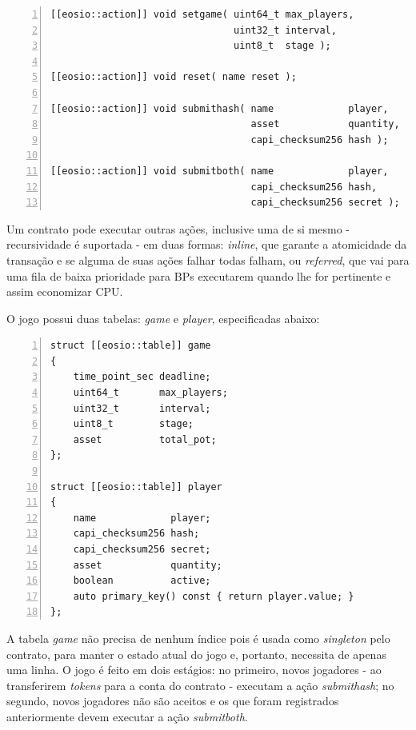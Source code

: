 \documentclass[a4paper,12pt]{monografia}
\theoremstyle{plain}
\theoremstyle{definition}
\theoremstyle{remark}
\begin{document}
\lstset{tabsize=5,language=C++,showstringspaces=false,basicstyle=\ttfamily\small,keywordstyle=\bf,breaklines=true}
\begin{singlespacing}
\begin{lstlisting}[frame=single,framexrightmargin=1pt,numbers=left]
[[eosio::action]] void setgame( uint64_t max_players,
                                uint32_t interval,
                                uint8_t  stage );

[[eosio::action]] void reset( name reset );

[[eosio::action]] void submithash( name             player,
                                   asset            quantity,
                                   capi_checksum256 hash );

[[eosio::action]] void submitboth( name             player,
                                   capi_checksum256 hash,
                                   capi_checksum256 secret );
\end{lstlisting}
\end{singlespacing}

Um contrato pode executar outras a\c{c}\~oes, inclusive uma de si mesmo - recursividade \'e suportada - em duas formas: \textit{inline}, que garante a atomicidade da transa\c{c}\~ao e se alguma de suas a\c{c}\~oes falhar todas falham, ou \textit{referred}, que vai para uma fila de baixa prioridade para BPs executarem quando lhe for pertinente e assim economizar CPU.

O jogo possui duas tabelas: \textit{game} e \textit{player}, especificadas abaixo:

\lstset{tabsize=5,language=C++,showstringspaces=false,basicstyle=\ttfamily\small,keywordstyle=\bf,breaklines=true}
\begin{singlespacing}
\begin{lstlisting}[frame=single,framexrightmargin=1pt,numbers=left]
struct [[eosio::table]] game
{
    time_point_sec deadline;
    uint64_t       max_players;
    uint32_t       interval;
    uint8_t        stage;
    asset          total_pot;
};

struct [[eosio::table]] player
{
    name             player;
    capi_checksum256 hash;
    capi_checksum256 secret;
    asset            quantity;
    boolean          active;
    auto primary_key() const { return player.value; }
};
\end{lstlisting}
\end{singlespacing}

A tabela \textit{game} n\~ao precisa de nenhum \'indice pois \'e usada como \textit{singleton} pelo contrato, para manter o estado atual do jogo e, portanto, necessita de apenas uma linha.
O jogo \'e feito em dois est\'agios: no primeiro, novos jogadores - ao transferirem \textit{tokens} para a conta do contrato - executam a a\c{c}\~ao \textit{submithash}; no segundo, novos jogadores n\~ao s\~ao aceitos e os que foram registrados anteriormente devem executar a a\c{c}\~ao \textit{submitboth}.
\end{document}

